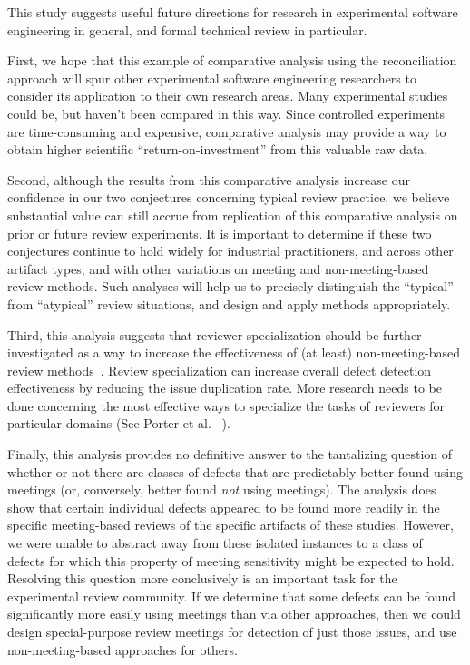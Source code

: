 This study suggests useful future directions for research in experimental
software engineering in general, and formal technical review in particular.

First, we hope that this example of comparative analysis using the
reconciliation approach will spur other experimental software engineering
researchers to consider its application to their own research areas.
Many experimental studies could be, but haven't been compared in this
way. Since controlled experiments are time-consuming and expensive,  
comparative analysis may provide a way to obtain higher scientific
``return-on-investment'' from this valuable raw data.

Second, although the results from this comparative analysis increase our
confidence in our two conjectures concerning typical review practice, we
believe substantial value can still accrue from replication of this
comparative analysis on prior or future review experiments.  It
is important to determine if these two conjectures continue to hold widely 
for industrial practitioners, and across other artifact types, and with other
variations on meeting and non-meeting-based review methods.  Such analyses
will help us to precisely distinguish the ``typical'' from ``atypical'' 
review situations, and design and apply methods appropriately. 

Third, this analysis suggests that reviewer specialization should be
further investigated as a way to increase the effectiveness of (at least)
non-meeting-based review methods~\cite{PVB:TSE94}. Review specialization can 
increase
overall defect detection effectiveness by reducing the issue duplication
rate. More research needs to be done concerning the most effective ways to
specialize the tasks of reviewers for particular domains 
(See Porter et al. ~\cite{PVB:TSE94}).

Finally, this analysis provides no definitive answer to the tantalizing
question of whether or not there are classes of defects that are
predictably better found using meetings (or, conversely, better found {\em
  not} using meetings).  The analysis does show that certain individual
defects appeared to be found more readily in the specific meeting-based
reviews of the specific artifacts of these studies. However, we were unable
to abstract away from these isolated instances to a class of defects for
which this property of meeting sensitivity might be expected to hold.
Resolving this question more conclusively is an important task for the
experimental review community.  If we determine that some defects can be
found significantly more easily using meetings than via other approaches,
then we could design special-purpose review meetings for detection of just
those issues, and use non-meeting-based approaches for others.


